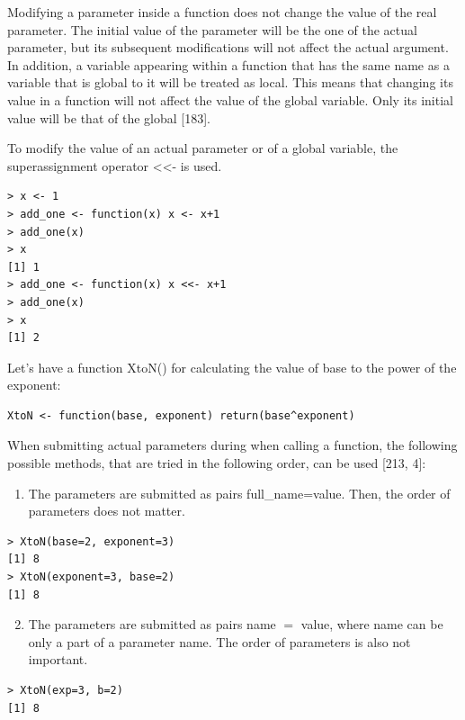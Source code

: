 \documentclass[11pt,openany,executivepaper]{book}
\begin{document}
Modifying a parameter inside a function does not change the value of the real parameter. The initial value of the parameter will be the one of the actual parameter, but its subsequent modifications will not affect the actual argument. In addition, a variable appearing within a function that has the same name as a variable that is global to it will be treated as local. This means that changing its value in a function will not affect the value of the global variable. Only its initial value will be that of the global [183].

To modify the value of an actual parameter or of a global variable, the superassignment operator <<- is used.

\begin{verbatim}
> x <- 1
> add_one <- function(x) x <- x+1
> add_one(x)
> x
[1] 1
> add_one <- function(x) x <<- x+1
> add_one(x)
> x
[1] 2
\end{verbatim}

Let's have a function XtoN() for calculating the value of base to the power of the exponent:

\begin{verbatim}
XtoN <- function(base, exponent) return(base^exponent)
\end{verbatim}

When submitting actual parameters during when calling a function, the following possible methods, that are tried in the following order, can be used [213, 4]:

\begin{enumerate}
  \item The parameters are submitted as pairs full\_name=value. Then, the order of parameters does not matter.
\end{enumerate}

\begin{verbatim}
> XtoN(base=2, exponent=3)
[1] 8
> XtoN(exponent=3, base=2)
[1] 8
\end{verbatim}

\begin{enumerate}
  \setcounter{enumi}{1}
  \item The parameters are submitted as pairs name $=$ value, where name can be only a part of a parameter name. The order of parameters is also not important.
\end{enumerate}

\begin{verbatim}
> XtoN(exp=3, b=2)
[1] 8
\end{verbatim}
\end{document}

